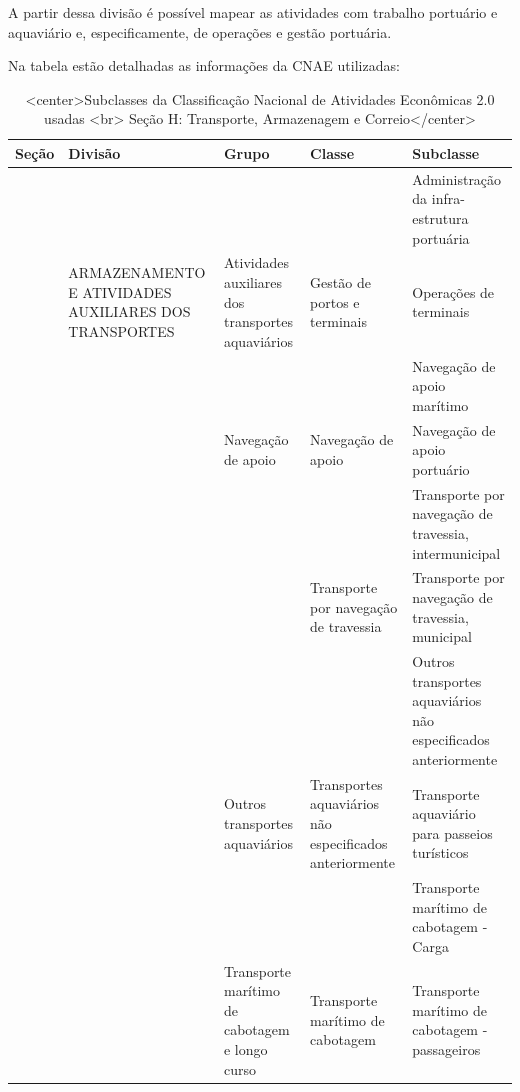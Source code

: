 \documentclass[
]{article}
\begin{document}
A partir dessa divisão é possível mapear as atividades com trabalho
portuário e aquaviário e, especificamente, de operações e gestão
portuária.

Na tabela estão detalhadas as informações da CNAE utilizadas:

\begin{table}

\caption{\label{tab:tabela1}<center>Subclasses da Classificação Nacional de Atividades Econômicas 2.0 usadas <br> Seção H: Transporte, Armazenagem e Correio</center>}
\centering
\begin{tabular}[t]{>{}lllll}
\toprule
Seção & Divisão & Grupo & Classe & Subclasse\\
\midrule
 &  &  &  & Administração da infra-estrutura portuária\\
\cmidrule{5-5}
 & \multirow[t]{-2}{*}{\raggedright\arraybackslash ARMAZENAMENTO E ATIVIDADES AUXILIARES DOS TRANSPORTES} & \multirow[t]{-2}{*}{\raggedright\arraybackslash Atividades auxiliares dos transportes aquaviários} & \multirow[t]{-2}{*}{\raggedright\arraybackslash Gestão de portos e terminais} & Operações de terminais\\
\cmidrule{2-5}
 &  &  &  & Navegação de apoio marítimo\\
\cmidrule{5-5}
 &  & \multirow[t]{-2}{*}{\raggedright\arraybackslash Navegação de apoio} & \multirow[t]{-2}{*}{\raggedright\arraybackslash Navegação de apoio} & Navegação de apoio portuário\\
\cmidrule{3-5}
 &  &  &  & Transporte por navegação de travessia, intermunicipal\\
\cmidrule{5-5}
 &  &  & \multirow[t]{-2}{*}{\raggedright\arraybackslash Transporte por navegação de travessia} & Transporte por navegação de travessia, municipal\\
\cmidrule{4-5}
 &  &  &  & Outros transportes aquaviários não especificados anteriormente\\
\cmidrule{5-5}
 &  & \multirow[t]{-4}{*}{\raggedright\arraybackslash Outros transportes aquaviários} & \multirow[t]{-2}{*}{\raggedright\arraybackslash Transportes aquaviários não especificados anteriormente} & Transporte aquaviário para passeios turísticos\\
\cmidrule{3-5}
 &  &  &  & Transporte marítimo de cabotagem - Carga\\
\cmidrule{5-5}
 &  & \multirow[t]{-2}{*}{\raggedright\arraybackslash Transporte marítimo de cabotagem e longo curso} & \multirow[t]{-2}{*}{\raggedright\arraybackslash Transporte marítimo de cabotagem} & Transporte marítimo de cabotagem - passageiros\\

\end{tabular}
\end{table}
\end{document}
